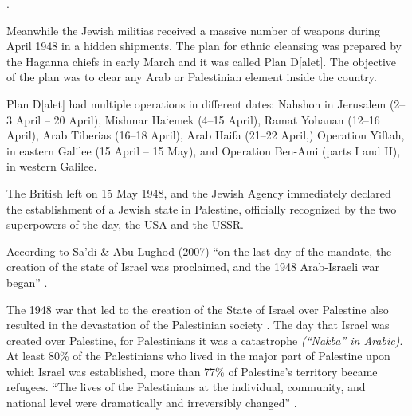  
 
 
\cite[p.40]{Pappe2006}.
 
 Meanwhile the Jewish militias received a massive number of weapons during April 1948 in a hidden shipments\citep{Morris2008}\citep{Pappe2006}. The plan for ethnic cleansing was prepared by the Haganna chiefs in early March and it was called Plan D[alet]\citep{Shlaim2014}. The objective of the plan was to clear any Arab or Palestinian element inside the country\citep{Pappe2006}\citep{Shlaim2014}.
 
Plan D[alet] had multiple operations in different dates:
Nahshon in Jerusalem (2–3 April – 20 April),
Mishmar Ha‘emek (4–15 April),
Ramat Yohanan (12–16 April),
Arab Tiberias (16–18 April), 
Arab Haifa (21–22 April,)
Operation Yiftah, in eastern Galilee (15 April – 15 May), and
Operation Ben-Ami (parts I and II), in western Galilee\citep{Morris2004}.

The British left on 15 May 1948, and the Jewish Agency immediately
declared the establishment of a Jewish state in Palestine, officially recognized
by the two superpowers of the day, the USA and the USSR\citep{Pappe2006}.
 
 According to Sa’di \& Abu-Lughod
(2007) “on the last day of the mandate, the creation of the state of Israel was proclaimed,
and the 1948 Arab-Israeli war began” \citep{Sadi2007}. 



The 1948 war that led to the creation of the State of Israel over Palestine also resulted in the devastation of the Palestinian society \citep{Sadi2007}. The day that Israel was created over Palestine, for Palestinians it was a catastrophe \textit{(“Nakba” in Arabic)}. At least 80\% of the Palestinians who lived in the major part of Palestine upon which Israel was established, more than 77\% of Palestine’s territory became refugees. “The lives of the Palestinians at the individual,
community, and national level were dramatically and irreversibly changed” \citep{Sadi2007}.









